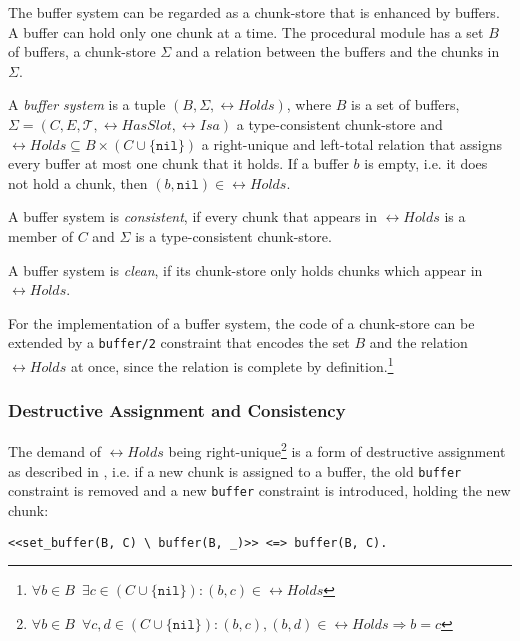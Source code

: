 The buffer system can be regarded as a chunk-store that is enhanced by buffers. A buffer can hold only one chunk at a time. The procedural module has a set $B$ of buffers, a chunk-store $\Sigma$ and a relation between the buffers and the chunks in $\Sigma$.

\begin{definition}
\label{def:buffer_system}
A \emph{buffer system} is a tuple $(B,\Sigma,\rel{Holds})$, where $B$ is a set of buffers, $\Sigma = (C, E, \mathcal{T}, \rel{HasSlot}, \rel{Isa})$ a type-consistent chunk-store and $\rel{Holds} \subseteq B \times (C \cup \{ \mathtt{nil} \})$ a right-unique and left-total relation that assigns every buffer at most one chunk that it holds. If a buffer $b$ is empty, i.e. it does not hold a chunk, then $(b,\mathtt{nil}) \in \rel{Holds}$.

A buffer system is \emph{consistent}, if every chunk that appears in $\rel{Holds}$ is a member of $C$ and $\Sigma$ is a type-consistent chunk-store.

A buffer system is \emph{clean}, if its chunk-store only holds chunks which appear in $\rel{Holds}$.
\end{definition}

For the implementation of a buffer system, the code of a chunk-store can be extended by a \lstinline|buffer/2| constraint that encodes the set $B$ and the relation $\rel{Holds}$ at once, since the relation is complete by definition.\footnote{$\forall b \in B \enspace \exists c \in (C \cup \{ \mathtt{nil} \}): (b,c) \in \rel{Holds}$}

\subsubsection{Destructive Assignment and Consistency}
\label{destructive_assignment}

The demand of $\rel{Holds}$ being right-unique\footnote{$\forall b \in B \enspace \forall c, d \in (C \cup \{ \mathtt{nil} \}): (b,c), (b,d) \in \rel{Holds} \Rightarrow b = c$} is a form of destructive assignment as described in \cite[p. 32]{fru_chr_book_2009}, i.e. if a new chunk is assigned to a buffer, the old \lstinline|buffer| constraint is removed and a new \lstinline|buffer| constraint is introduced, holding the new chunk:

\begin{lstlisting}
<<set_buffer(B, C) \ buffer(B, _)>> <=> buffer(B, C).
\end{lstlisting}

